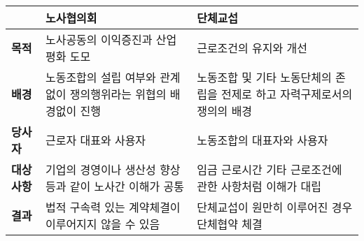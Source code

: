 \begin{tabular}{p{2cm} p{7cm} p{7cm}}
\toprule
 & \textbf{노사협의회} & \textbf{단체교섭} \\
\midrule
\textbf{목적} & 노사공동의 이익증진과 산업평화 도모 & 근로조건의 유지와 개선 \\ \hline
\textbf{배경} & 노동조합의 설립 여부와 관계없이 쟁의행위라는 위협의 배경없이 진행 & 노동조합 및 기타 노동단체의 존립을 전제로 하고 자력구제로서의 쟁의의 배경 \\ \hline
\textbf{당사자} & 근로자 대표와 사용자 & 노동조합의 대표자와 사용자 \\ \hline
\textbf{대상사항} & 기업의 경영이나 생산성 향상 등과 같이 노사간 이해가 공통 & 임금 근로시간 기타 근로조건에 관한 사항처럼 이해가 대립 \\ \hline
\textbf{결과} & 법적 구속력 있는 계약체결이 이루어지지 않을 수 있음 & 단체교섭이 원만히 이루어진 경우 단체협약 체결 \\
\bottomrule
\end{tabular}
